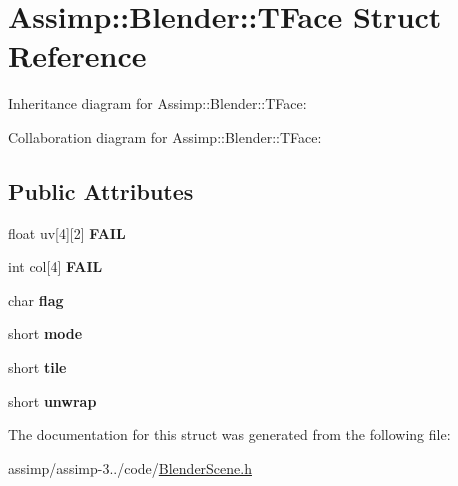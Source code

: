 \hypertarget{struct_assimp_1_1_blender_1_1_t_face}{\section{Assimp\+:\+:Blender\+:\+:T\+Face Struct Reference}
\label{struct_assimp_1_1_blender_1_1_t_face}
}


Inheritance diagram for Assimp\+:\+:Blender\+:\+:T\+Face\+:


Collaboration diagram for Assimp\+:\+:Blender\+:\+:T\+Face\+:
\subsection*{Public Attributes}
\begin{DoxyCompactItemize}
\item 
\hypertarget{struct_assimp_1_1_blender_1_1_t_face_aa50ee3e3a73445afa1d86d756496cc63}{float uv\mbox{[}4\mbox{]}\mbox{[}2\mbox{]} {\bfseries F\+A\+I\+L}}\label{struct_assimp_1_1_blender_1_1_t_face_aa50ee3e3a73445afa1d86d756496cc63}

\item 
\hypertarget{struct_assimp_1_1_blender_1_1_t_face_a1c4c823155d599886ffeccc6c6109d86}{int col\mbox{[}4\mbox{]} {\bfseries F\+A\+I\+L}}\label{struct_assimp_1_1_blender_1_1_t_face_a1c4c823155d599886ffeccc6c6109d86}

\item 
\hypertarget{struct_assimp_1_1_blender_1_1_t_face_acb1c9e9a0cbdf924bbcc9fcc2d721fed}{char {\bfseries flag}}\label{struct_assimp_1_1_blender_1_1_t_face_acb1c9e9a0cbdf924bbcc9fcc2d721fed}

\item 
\hypertarget{struct_assimp_1_1_blender_1_1_t_face_a77f4e71126f627728cfadb834dc41797}{short {\bfseries mode}}\label{struct_assimp_1_1_blender_1_1_t_face_a77f4e71126f627728cfadb834dc41797}

\item 
\hypertarget{struct_assimp_1_1_blender_1_1_t_face_a7fcb25ddf8fdd88c186759963a242722}{short {\bfseries tile}}\label{struct_assimp_1_1_blender_1_1_t_face_a7fcb25ddf8fdd88c186759963a242722}

\item 
\hypertarget{struct_assimp_1_1_blender_1_1_t_face_abdcb03373c9d7552a683f4dbeed9e7d7}{short {\bfseries unwrap}}\label{struct_assimp_1_1_blender_1_1_t_face_abdcb03373c9d7552a683f4dbeed9e7d7}

\end{DoxyCompactItemize}


The documentation for this struct was generated from the following file\+:\begin{DoxyCompactItemize}
\item 
assimp/assimp-\/3../code/\hyperlink{_blender_scene_8h}{Blender\+Scene.\+h}\end{DoxyCompactItemize}

